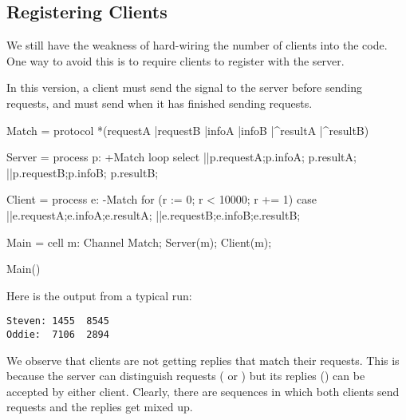 \subsection{Registering Clients}

We still have the weakness of hard-wiring the number of clients into the code.  One way to avoid this is to require clients to register with the server.

In this version, a client must send the signal  to the server before sending requests, and must send  when it has finished sending requests.
\begin{code}
Match = protocol { *(requestA |requestB |infoA |infoB |^resultA |^resultB) }

Server = process p: +Match
{
    loop select{
                ||p.requestA;p.infoA; p.resultA;
                ||p.requestB;p.infoB; p.resultB;
    }
}

Client = process e: -Match
{
  for (r := 0; r < 10000; r += 1)
  {
        case{
                ||e.requestA;e.infoA;e.resultA;
                ||e.requestB;e.infoB;e.resultB;
        }
  }
}

Main = cell
{
  m: Channel Match;
  Server(m);
  Client(m);
}

Main()
\end{code}

Here is the output from a typical run:
\begin{verbatim}
Steven: 1455  8545
Oddie:  7106  2894
\end{verbatim}

We observe that clients are not getting replies that match their requests.  This is because the server can distinguish requests ( or ) but its replies () can be accepted by either client.  Clearly, there are sequences in which both clients send requests and the replies get mixed up.

